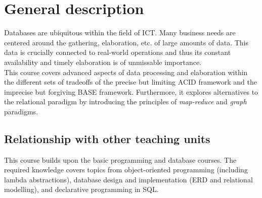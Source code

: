 \section{General description}
	Databases are ubiquitous within the field of ICT. Many business needs are centered around the gathering, elaboration, etc. of large amounts of data. This data is crucially connected to real-world operations and thus its constant availability and timely elaboration is of unmissable importance. \\
		
		This course covers advanced aspects of data processing and elaboration within the different sets of tradeoffs of the precise but limiting ACID framework and the imprecise but forgiving BASE framework. Furthermore, it explores alternatives to the relational paradigm by introducing the principles of \textit{map-reduce} and \textit{graph} paradigms. \\

	\subsection{Relationship with other teaching units}
		This course builds upon the basic programming and database courses. The required knowledge covers topics from object-oriented programming (including lambda abstractions), database design and implementation (ERD and relational modelling), and declarative programming in SQL.
